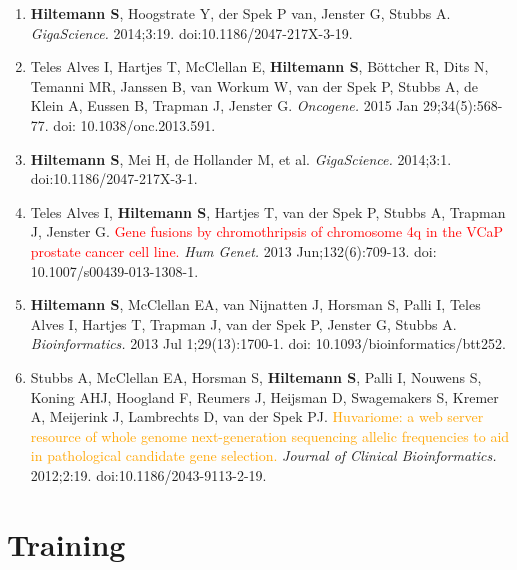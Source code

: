 \documentclass[]{shiltemann-cv}
\begin{document}
\begin{enumerate}
\item \textbf{Hiltemann S}, Hoogstrate Y, der Spek P van, Jenster G, Stubbs A. {\color{lightgray}{iReport: a generalised Galaxy solution for integrated experimental reporting.}} \textit{GigaScience.} 2014;3:19. doi:10.1186/2047-217X-3-19.

\item Teles Alves I, Hartjes T, McClellan E, \textbf{Hiltemann S}, Böttcher R, Dits N, Temanni MR, Janssen B, van Workum W, van der Spek P, Stubbs A, de Klein A, Eussen B, Trapman J, Jenster G. {\color{lightgray}{Next-generation sequencing reveals novel rare fusion events with functional implication in prostate cancer.}} \textit{Oncogene.} 2015 Jan 29;34(5):568-77. doi: 10.1038/onc.2013.591.

\item \textbf{Hiltemann S}, Mei H, de Hollander M, et al. {\color{lightgray}{CGtag: complete genomics toolkit and annotation in a cloud-based Galaxy.}} \textit{GigaScience.} 2014;3:1. doi:10.1186/2047-217X-3-1.

\item Teles Alves I, \textbf{Hiltemann S}, Hartjes T, van der Spek P, Stubbs A, Trapman J, Jenster G. {\textcolor{red}{Gene fusions by chromothripsis of chromosome 4q in the VCaP prostate cancer cell line.}} \textit{Hum Genet.} 2013 Jun;132(6):709-13. doi: 10.1007/s00439-013-1308-1.

\item \textbf{Hiltemann S}, McClellan EA, van Nijnatten J, Horsman S, Palli I, Teles Alves I, Hartjes T, Trapman J, van der Spek P, Jenster G, Stubbs A. {\color{lightgray}{iFUSE: integrated fusion gene explorer.}} \textit{Bioinformatics.} 2013 Jul 1;29(13):1700-1. doi: 10.1093/bioinformatics/btt252.

\item Stubbs A, McClellan EA, Horsman S, \textbf{Hiltemann S}, Palli I, Nouwens S, Koning AHJ, Hoogland F, Reumers J, Heijsman D, Swagemakers S, Kremer A, Meijerink J, Lambrechts D, van der Spek PJ. \textcolor{orange}{Huvariome: a web server resource of whole genome next-generation sequencing allelic frequencies to aid in pathological candidate gene selection.} \textit{Journal of Clinical Bioinformatics.} 2012;2:19. doi:10.1186/2043-9113-2-19.


\end{enumerate}

\section{Training}
\end{document}
